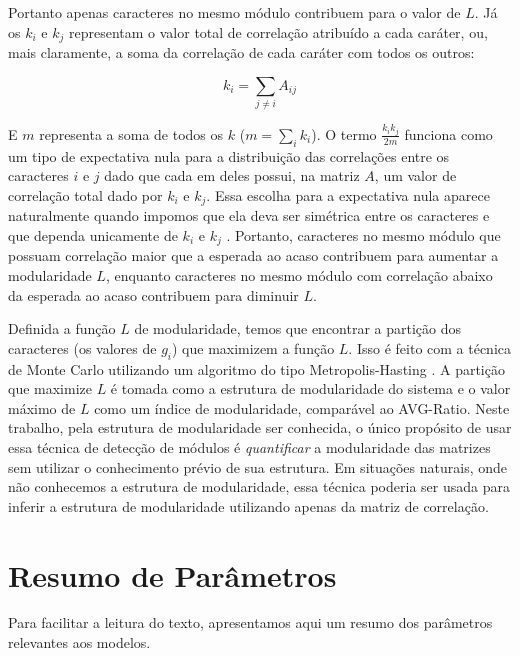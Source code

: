 Portanto apenas caracteres no mesmo módulo contribuem para o valor de $L$.
Já os $k_i$ e $k_j$  representam o valor total de correlação atribuído a
cada caráter, ou, mais claramente, a soma da correlação de cada caráter com
todos os outros:

\begin{equation}
   k_i = \sum_{j \neq i} A_{ij}
\end{equation}

E $m$ representa a soma de todos os $k$ ($m=\sum_i k_i$).
O termo $\frac{k_ik_j}{2m}$ funciona como um tipo de expectativa nula
para a distribuição das correlações entre os caracteres $i$ e $j$ dado que
cada em deles possui, na matriz $A$, um valor de correlação total
dado por $k_i$ e $k_j$.
Essa escolha para a expectativa nula aparece naturalmente quando
impomos que ela deva ser simétrica entre os caracteres e que dependa
unicamente de $k_i$ e $k_j$ \citep[Para detalhes veja][]{Newman2006a}.
Portanto, caracteres no mesmo módulo que possuam correlação maior que a
esperada ao acaso contribuem para aumentar a modularidade $L$, enquanto
caracteres no mesmo módulo com correlação abaixo da esperada ao acaso
contribuem para diminuir $L$.

Definida a função $L$ de modularidade, temos que encontrar a partição
dos caracteres (os valores de $g_i$) que maximizem a função $L$.
Isso é feito com a técnica de Monte Carlo utilizando um algoritmo
do tipo Metropolis-Hasting \citep{Metropolis1953}.
A partição que maximize $L$ é tomada como a estrutura de modularidade do
sistema e o valor máximo de $L$ como um índice de modularidade,
comparável ao AVG-Ratio.
Neste trabalho, pela estrutura de modularidade ser conhecida, o único propósito 
de usar essa técnica de detecção de módulos é {\it quantificar} a 
modularidade das matrizes sem utilizar o conhecimento prévio de sua
estrutura.
Em situações naturais, onde não conhecemos a estrutura de modularidade,
essa técnica poderia ser usada para inferir a estrutura de modularidade
utilizando apenas da matriz de correlação.

\newpage
\section{Resumo de Parâmetros}

Para facilitar a leitura do texto, apresentamos aqui um resumo dos
parâmetros relevantes aos modelos.

